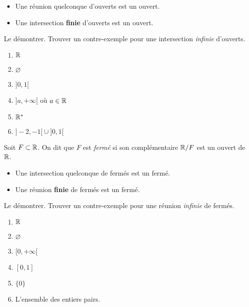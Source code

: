 \documentclass[../main.tex]{subfiles}
\begin{document}
\begin{prop}\leavevmode
	\begin{itemize}
		\item Une réunion quelconque d'ouverts est un ouvert.
		\item Une intersection \textbf{finie} d'ouverts est un ouvert.
	\end{itemize}
\end{prop}

\begin{exo}[M]
	Le démontrer. Trouver un contre-exemple pour une intersection \textit{infinie} d'ouverts.
\end{exo}

\begin{exe}
	\begin{multicols}{2}
		\begin{enumerate}
			\item $\mathbb R$
			\item $\varnothing$
			\item $]0,1[$
			\item $]a,+\infty[$ où $a\in\mathbb R$
			\item $\mathbb R^*$
			\item ${]-2,-1[}\cup{]0,1[}$
		\end{enumerate}
	\end{multicols}
\end{exe}

\begin{mydef}[Fermé]
	Soit $F\subset\mathbb R$. On dit que $F$ est \textit{fermé} si son complémentaire $\mathbb R/F$ est un ouvert de $\mathbb R$.
\end{mydef}

\begin{prop}\leavevmode
	\begin{itemize}
		\item Une intersection quelconque de fermés est un fermé.
		\item Une réunion \textbf{finie} de fermés est un fermé.
	\end{itemize}
\end{prop}

\begin{exo}[M]
	Le démontrer. Trouver un contre-exemple pour une réunion \textit{infinie} de fermés.
\end{exo}

\begin{exe}
	\begin{multicols}{2}
		\begin{enumerate}
			\item $\mathbb R$
			\item $\varnothing$
			\item $[0,+\infty[$
			\item $[0,1]$
			\item $\{0\} $
			\item L'ensemble des entiers pairs.
		\end{enumerate}
	\end{multicols}
\end{exe}
\end{document}
